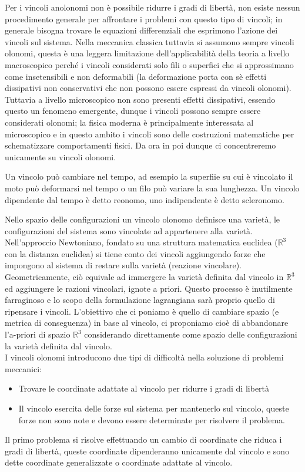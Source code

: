 \documentclass[
10pt, %
a4paper, %
oneside, %
headinclude,footinclude, %
BCOR5mm, %
]{scrartcl}
\begin{document}
\begin{osservazione}
	Per i vincoli anolonomi non è possibile ridurre i gradi di libertà, non esiste nessun procedimento generale per affrontare i problemi con questo tipo di vincoli; in generale bisogna trovare le equazioni differenziali che esprimono l'azione dei vincoli sul sistema. Nella meccanica classica tuttavia si assumono sempre vincoli olonomi, questa è una leggera limitazione dell'applicabilità della teoria a livello macroscopico perché i vincoli considerati solo fili o superfici che si approssimano come insetensibili e non deformabili (la deformazione porta con sè effetti dissipativi non conservativi che non possono essere espressi da vincoli olonomi). Tuttavia a livello microscopico non sono presenti effetti dissipativi, essendo questo un fenomeno emergente, dunque i vincoli possono sempre essere considerati olonomi; la fisica moderna è principalmente interessata al microscopico e in questo ambito i vincoli sono delle costruzioni matematiche per schematizzare comportamenti fisici. Da ora in poi dunque ci concentreremo unicamente su vincoli olonomi.
\end{osservazione}
\begin{definizione}
	Un vincolo può cambiare nel tempo, ad esempio la superfiie su cui è vincolato il moto può deformarsi nel tempo o un filo può variare la sua lunghezza. Un vincolo dipendente dal tempo è detto reonomo, uno indipendente è detto scleronomo.
\end{definizione}
Nello spazio delle configurazioni un vincolo olonomo definisce una varietà, le configurazioni del sistema sono vincolate ad appartenere alla varietà. Nell'approccio Newtoniano, fondato su una struttura matematica euclidea (\(\mathbb{R}^3\) con la distanza euclidea) si tiene conto dei vincoli aggiungendo forze che impongono al sistema di restare sulla varietà (reazione vincolare). Geometricamente, ciò equivale ad immergere la varietà definita dal vincolo in \(\mathbb{R}^3\) ed aggiungere le razioni vincolari, ignote a priori. Questo processo è inutilmente farraginoso e lo scopo della formulazione lagrangiana sarà proprio quello di ripensare i vincoli. L'obiettivo che ci poniamo è quello di cambiare spazio (e metrica di conseguenza) in base al vincolo, ci proponiamo cioè di abbandonare l'a-priori di spazio \(\mathbb{R}^3\) considerando direttamente come spazio delle configurazioni la varietà definita dal vincolo.\\
I vincoli olonomi introducono due tipi di difficoltà nella soluzione di problemi meccanici:
\begin{itemize}
	\item Trovare le coordinate adattate al vincolo per ridurre i gradi di libertà
	\item Il vincolo esercita delle forze sul sistema per mantenerlo sul vincolo, queste forze non sono note e devono essere determinate per risolvere il problema.
\end{itemize}
Il primo problema si risolve effettuando un cambio di coordinate che riduca i gradi di libertà, queste coordinate dipenderanno unicamente dal vincolo e sono dette coordinate generalizzate o coordinate adattate al vincolo.
\end{document}

